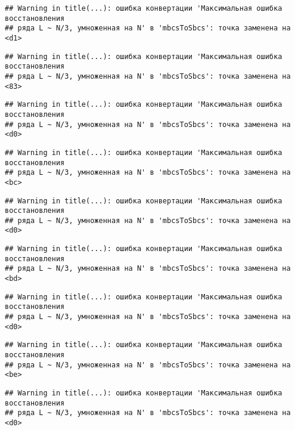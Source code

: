 \documentclass[
]{article}
\begin{document}
\begin{verbatim}
## Warning in title(...): ошибка конвертации 'Максимальная ошибка восстановления
## ряда L ~ N/3, умноженная на N' в 'mbcsToSbcs': точка заменена на <d1>
\end{verbatim}

\begin{verbatim}
## Warning in title(...): ошибка конвертации 'Максимальная ошибка восстановления
## ряда L ~ N/3, умноженная на N' в 'mbcsToSbcs': точка заменена на <83>
\end{verbatim}

\begin{verbatim}
## Warning in title(...): ошибка конвертации 'Максимальная ошибка восстановления
## ряда L ~ N/3, умноженная на N' в 'mbcsToSbcs': точка заменена на <d0>
\end{verbatim}

\begin{verbatim}
## Warning in title(...): ошибка конвертации 'Максимальная ошибка восстановления
## ряда L ~ N/3, умноженная на N' в 'mbcsToSbcs': точка заменена на <bc>
\end{verbatim}

\begin{verbatim}
## Warning in title(...): ошибка конвертации 'Максимальная ошибка восстановления
## ряда L ~ N/3, умноженная на N' в 'mbcsToSbcs': точка заменена на <d0>
\end{verbatim}

\begin{verbatim}
## Warning in title(...): ошибка конвертации 'Максимальная ошибка восстановления
## ряда L ~ N/3, умноженная на N' в 'mbcsToSbcs': точка заменена на <bd>
\end{verbatim}

\begin{verbatim}
## Warning in title(...): ошибка конвертации 'Максимальная ошибка восстановления
## ряда L ~ N/3, умноженная на N' в 'mbcsToSbcs': точка заменена на <d0>
\end{verbatim}

\begin{verbatim}
## Warning in title(...): ошибка конвертации 'Максимальная ошибка восстановления
## ряда L ~ N/3, умноженная на N' в 'mbcsToSbcs': точка заменена на <be>
\end{verbatim}

\begin{verbatim}
## Warning in title(...): ошибка конвертации 'Максимальная ошибка восстановления
## ряда L ~ N/3, умноженная на N' в 'mbcsToSbcs': точка заменена на <d0>
\end{verbatim}
\end{document}

